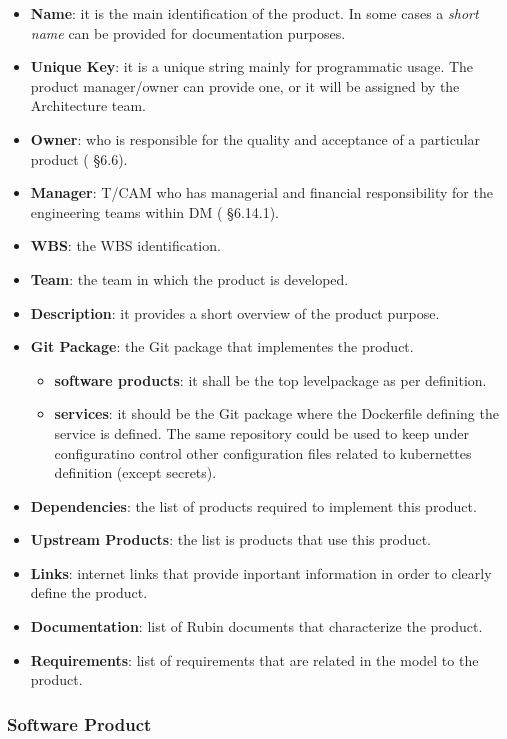 \begin{itemize}
  \item \textbf{Name}: it is the main identification of the product. In some cases a \textit{short name} can be provided for documentation purposes.
  \item \textbf{Unique Key}: it is a unique string mainly for programmatic usage. The product manager/owner can provide one, or it will be assigned by the Architecture team.
  \item \textbf{Owner}: who is responsible for the quality and acceptance of a particular product ( \S6.6).
  \item \textbf{Manager}: {T/CAM} who has managerial and financial responsibility for the engineering teams within DM ( \S6.14.1).
  \item \textbf{WBS}: the WBS identification.
  \item \textbf{Team}: the team in which the product is developed.
  \item \textbf{Description}: it provides a short overview of the product purpose.
  \item \textbf{Git Package}: the Git package that implementes the product.
  \begin{itemize}
    \item \textbf{software products}: it shall be the top levelpackage as per  definition. 
    \item \textbf{services}: it should be the Git package where the Dockerfile defining the service is defined. The same repository could be used to keep under configuratino control other configuration files related to kubernettes definition (except secrets).
  \end{itemize}
  \item \textbf{Dependencies}: the list of products required to implement this product.
  \item \textbf{Upstream Products}: the list is products that use this product.
  \item \textbf{Links}: internet links that provide inportant information in order to clearly define the product.
  \item \textbf{Documentation}: list of Rubin documents that characterize the product.
  \item \textbf{Requirements}: list of requirements that are related in the model to the product.
\end{itemize}


\subsubsection{Software Product} \label{sec:swproduct}

